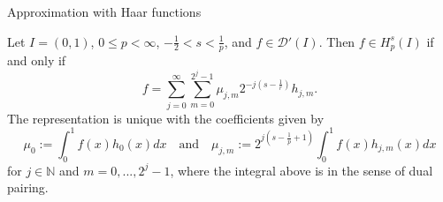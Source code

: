 \documentclass{beamer}
\begin{document}
\begin{frame}{Approximation with Haar functions}
        \begin{theorem}
                {\footnotesize
                Let
                $ I = (0,1) $,
                $ 0 \le p < \infty $,
                $ - \frac{1}{2} < s < \frac{1}{p} $,
                and
                $ f \in \mathcal{D}'(I) $.
                Then
                $f \in H^{s}_{p}(I)$
                if and only if
                \begin{equation*}
                        f = \sum_{j=0}^{\infty} \sum_{m=0}^{2^j-1} \mu_{j,m} 2^{-j\left( s - \frac{1}{r} \right)} h_{j,m}.
                \end{equation*}
                The representation is unique with the coefficients given by
                \begin{equation*}
                        \mu_0 := \int_0^1 f(x) h_0(x) dx
                        \quad \text{and} \quad
                        \mu_{j,m} := 2^{j\left( s - \frac{1}{p} + 1 \right)} \int_{0}^1 f(x) h_{j,m}(x) dx
                \end{equation*}
                for
                $j\in\mathbb{N}$
                and
                $m=0,...,2^j-1$,
                {\color{red}where the integral above is in the sense of dual pairing}.
                }
        \end{theorem}
\end{frame}
\end{document}
